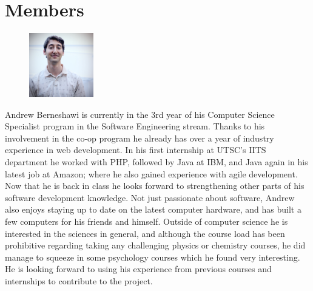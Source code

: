 \documentclass[pdftex,10pt,a4paper]{report}
\begin{document}
\section{Members}
\begin{figure}
  \vspace{-20pt}
  \begin{center}
    \includegraphics[width=0.25\textwidth]{img/group/andrew}
  \end{center}
  \vspace{-20pt}
\end{figure}
 Andrew Berneshawi is currently in the 3rd year of his Computer Science Specialist program in the Software Engineering stream. Thanks to his involvement in the co-op program he already has over a year of industry experience in web development. In his first internship at UTSC's IITS department he worked with PHP, followed by Java at IBM, and Java again in his latest job at Amazon; where he also gained experience with agile development. Now that he is back in class he looks forward to strengthening other parts of his software development knowledge. Not just passionate about software, Andrew also enjoys staying up to date on the latest computer hardware, and has built a few computers for his friends and himself. Outside of computer science he is interested in the sciences in general, and although the course load has been prohibitive regarding taking any challenging physics or chemistry courses, he did manage to squeeze in some psychology courses which he found very interesting. He is looking forward to using his experience from previous courses and internships to contribute to the project. \\
\end{document}
